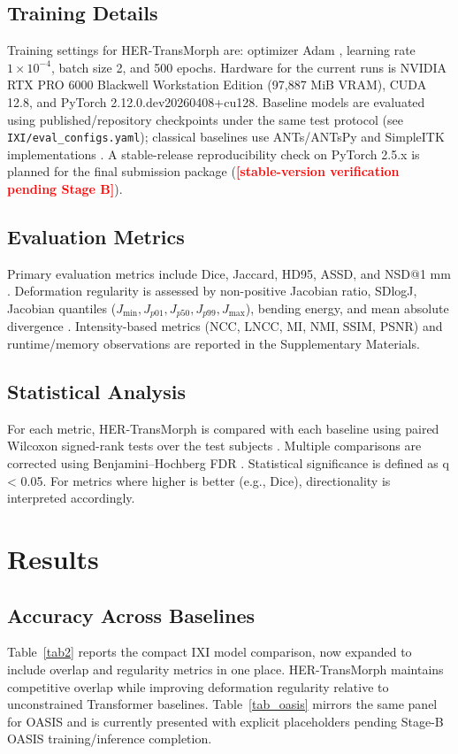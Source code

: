\documentclass[jimaging,article,submit,pdftex,moreauthors]{Definitions/mdpi}
\providecommand{\PH}[1]{\textcolor{red}{\textbf{[#1]}}}
\begin{document}
\subsection{Training Details}
Training settings for HER-TransMorph are: optimizer Adam \citep{kingma2014adam}, learning rate \(1\times10^{-4}\), batch size 2, and 500 epochs. Hardware for the current runs is NVIDIA RTX PRO 6000 Blackwell Workstation Edition (97,887 MiB VRAM), CUDA 12.8, and PyTorch 2.12.0.dev20260408+cu128. Baseline models are evaluated using published/repository checkpoints under the same test protocol (see \texttt{IXI/eval\_configs.yaml}); classical baselines use ANTs/ANTsPy and SimpleITK implementations \citep{avants2008ants,antspyx2024,simpleitk2013}. A stable-release reproducibility check on PyTorch 2.5.x is planned for the final submission package (\PH{stable-version verification pending Stage B}).

\subsection{Evaluation Metrics}
Primary evaluation metrics include Dice, Jaccard, HD95, ASSD, and NSD@1 mm \citep{dice1945,heimann2009,nikolov2018}. Deformation regularity is assessed by non-positive Jacobian ratio, SDlogJ, Jacobian quantiles (\(J_{\min}, J_{p01}, J_{p50}, J_{p99}, J_{\max}\)), bending energy, and mean absolute divergence \citep{rueckert1999nonrigid,ashburner1999morphometry}. Intensity-based metrics (NCC, LNCC, MI, NMI, SSIM, PSNR) and runtime/memory observations are reported in the Supplementary Materials.

\subsection{Statistical Analysis}
For each metric, HER-TransMorph is compared with each baseline using paired Wilcoxon signed-rank tests over the test subjects \citep{wilcoxon1945}. Multiple comparisons are corrected using Benjamini--Hochberg FDR \citep{bh1995}. Statistical significance is defined as q < 0.05. For metrics where higher is better (e.g., Dice), directionality is interpreted accordingly.

\section{Results}

\subsection{Accuracy Across Baselines}
Table~\ref{tab2} reports the compact IXI model comparison, now expanded to include overlap and regularity metrics in one place. HER-TransMorph maintains competitive overlap while improving deformation regularity relative to unconstrained Transformer baselines. Table~\ref{tab_oasis} mirrors the same panel for OASIS and is currently presented with explicit placeholders pending Stage-B OASIS training/inference completion.
\end{document}
